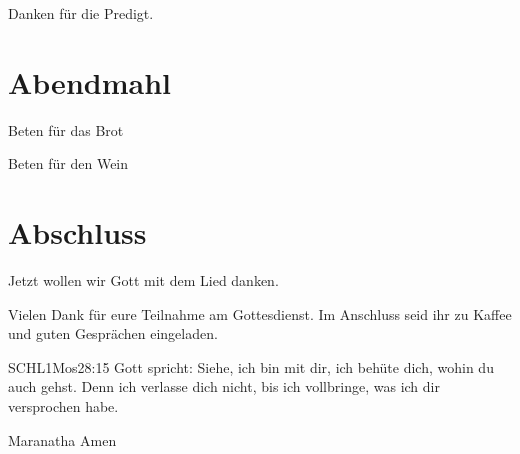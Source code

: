 \documentclass{../../inc/mybib}
\begin{document}
Danken für die Predigt.

\section{Abendmahl}

Beten für das Brot


Beten für den Wein


\section{Abschluss}

Jetzt wollen wir Gott mit dem Lied  danken.

Vielen Dank für eure Teilnahme am Gottesdienst. Im Anschluss seid ihr zu Kaffee und guten Gesprächen eingeladen.
\beten{}

\begin{bibelbox}{SCHL}{1Mos}{28:15}
Gott spricht: Siehe, ich bin mit dir,
ich behüte dich, wohin du auch gehst.
Denn ich verlasse dich nicht,
bis ich vollbringe, was ich dir versprochen habe.
\end{bibelbox}

Maranatha Amen
\end{document}
